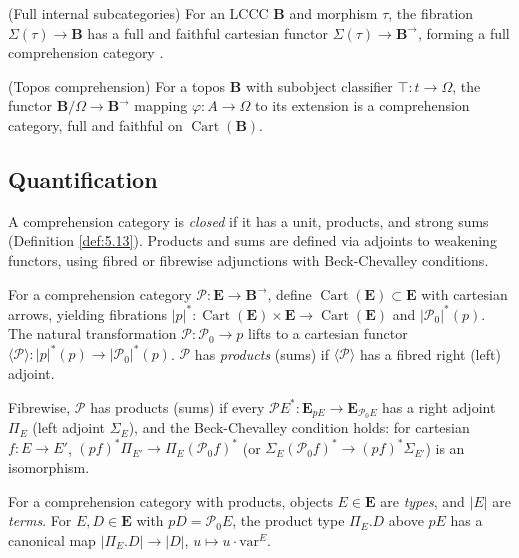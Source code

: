 \documentclass{article}
\begin{document}
\begin{example}
\label{ex:4.6}
(Full internal subcategories) For an LCCC $\mathbf{B}$ and morphism $\tau$, the fibration $\Sigma(\tau) \to \mathbf{B}$ has a full and faithful cartesian functor $\Sigma(\tau) \to \mathbf{B}^{\to}$, forming a full comprehension category \cite{Pitts1987, Johnstone1977}.
\end{example}

\begin{example}
\label{ex:4.7}
(Topos comprehension) For a topos $\mathbf{B}$ with subobject classifier $\top : t \to \Omega$, the functor $\mathbf{B}/\Omega \to \mathbf{B}^{\to}$ mapping $\varphi : A \to \Omega$ to its extension is a comprehension category, full and faithful on $\operatorname{Cart}(\mathbf{B})$.
\end{example}

\newpage
\subsection{Quantification}
\label{sec:quantification}

A comprehension category is \emph{closed} if it has a unit, products, and strong sums (Definition \ref{def:5.13}). Products and sums are defined via adjoints to weakening functors, using fibred or fibrewise adjunctions with Beck-Chevalley conditions.

For a comprehension category $\mathscr{P} : \mathbf{E} \to \mathbf{B}^{\to}$, define $\operatorname{Cart}(\mathbf{E}) \subset \mathbf{E}$ with cartesian arrows, yielding fibrations $|p|^* : \operatorname{Cart}(\mathbf{E}) \times \mathbf{E} \to \operatorname{Cart}(\mathbf{E})$ and $|\mathscr{P}_0|^*(p)$. The natural transformation $\mathscr{P} : \mathscr{P}_0 \to p$ lifts to a cartesian functor $\langle \mathscr{P} \rangle : |p|^*(p) \to |\mathscr{P}_0|^*(p)$. $\mathscr{P}$ has \emph{products} (sums) if $\langle \mathscr{P} \rangle$ has a fibred right (left) adjoint.

Fibrewise, $\mathscr{P}$ has products (sums) if every $\mathscr{P} E^* : \mathbf{E}_{p E} \to \mathbf{E}_{\mathscr{P}_0 E}$ has a right adjoint $\Pi_E$ (left adjoint $\Sigma_E$), and the Beck-Chevalley condition holds: for cartesian $f : E \to E'$, $(p f)^* \Pi_{E'} \to \Pi_E (\mathscr{P}_0 f)^*$ (or $\Sigma_E (\mathscr{P}_0 f)^* \to (p f)^* \Sigma_{E'}$) is an isomorphism.

\begin{definition}
\label{def:5.1}
For a comprehension category with products, objects $E \in \mathbf{E}$ are \emph{types}, and $|E|$ are \emph{terms}. For $E, D \in \mathbf{E}$ with $p D = \mathscr{P}_0 E$, the product type $\Pi_E . D$ above $p E$ has a canonical map $|\Pi_E . D| \to |D|$, $u \mapsto u \cdot \text{var}^E$.
\end{definition}
\end{document}
